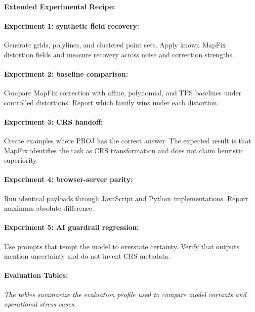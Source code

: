 \documentclass{article}
\begin{document}
\paragraph{Extended Experimental Recipe:}

\paragraph{Experiment 1: synthetic field recovery:}

Generate grids, polylines, and clustered point sets. Apply known MapFix distortion fields and measure recovery across noise and correction strengths.

\paragraph{Experiment 2: baseline comparison:}

Compare MapFix correction with affine, polynomial, and TPS baselines under controlled distortions. Report which family wins under each distortion.

\paragraph{Experiment 3: CRS handoff:}

Create examples where PROJ has the correct answer. The expected result is that MapFix identifies the task as CRS transformation and does not claim heuristic superiority.

\paragraph{Experiment 4: browser-server parity:}

Run identical payloads through JavaScript and Python implementations. Report maximum absolute difference.

\paragraph{Experiment 5: AI guardrail regression:}

Use prompts that tempt the model to overstate certainty. Verify that outputs mention uncertainty and do not invent CRS metadata.

\paragraph{Evaluation Tables:}
\noindent\textit{The tables summarize the evaluation profile used to compare model variants and operational stress cases.}
\end{document}
